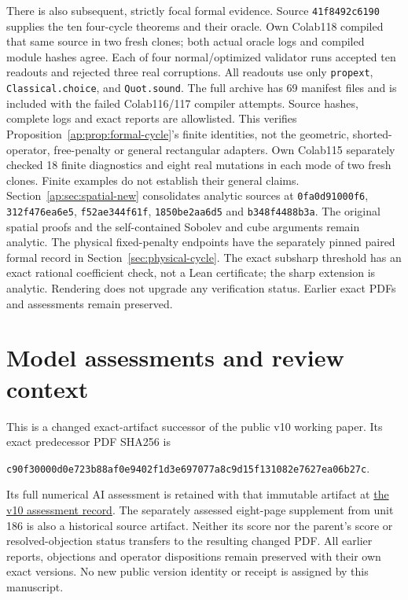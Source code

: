 \documentclass[11pt]{article}
\begin{document}
There is also subsequent, strictly focal formal evidence. Source
\texttt{41f8492c6190} supplies the ten four-cycle theorems and their oracle.
Own Colab118 compiled that same source in two fresh clones; both actual oracle logs
and compiled module hashes agree. Each of four normal/optimized validator runs
accepted ten readouts and rejected three real corruptions. All readouts use only
\texttt{propext}, \texttt{Classical.choice}, and \texttt{Quot.sound}.
The full archive has 69 manifest files and is included with the failed Colab116/117
compiler attempts. Source hashes, complete logs and exact reports are allowlisted.
This verifies Proposition~\ref{ap:prop:formal-cycle}'s finite identities, not the
geometric, shorted-operator, free-penalty or general rectangular adapters.
Own Colab115 separately checked 18 finite diagnostics and eight real mutations in
each mode of two fresh clones. Finite examples do not establish their general claims.
Section~\ref{ap:sec:spatial-new} consolidates analytic sources at
\texttt{0fa0d91000f6}, \texttt{312f476ea6e5}, \texttt{f52ae344f61f},
\texttt{1850be2aa6d5} and \texttt{b348f4488b3a}. The original spatial proofs and the self-contained Sobolev and cube
arguments remain analytic. The physical fixed-penalty endpoints have the
separately pinned paired formal record in Section~\ref{sec:physical-cycle}.
The exact subsharp threshold has an exact rational coefficient check, not a
Lean certificate; the sharp extension is analytic. Rendering does not upgrade
any verification status. Earlier exact PDFs and assessments remain preserved.

\section{Model assessments and review context}\label{sec:model-context}
This is a changed exact-artifact successor of the public v10 working paper.
Its exact predecessor PDF SHA256 is
\begin{center}\scriptsize\texttt{c90f30000d0e723b88af0e9402f1d3e697077a8c9d15f131082e7627ea06b27c}.\end{center}
Its full numerical AI assessment is retained with that immutable artifact at
\href{https://airr.science/papers/ARR-2026-7EPM3V3DP796BBRR/versions/v10/\#model-assessments}{the v10 assessment record}.
The separately assessed eight-page supplement from unit 186 is also a
historical source artifact. Neither its score nor the parent's score or
resolved-objection status transfers to the resulting changed PDF. All earlier
reports, objections and operator dispositions remain preserved with their
own exact versions. No new public version identity or receipt is assigned
by this manuscript.
\end{document}

